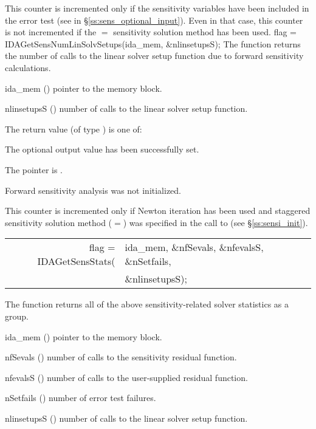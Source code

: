 {
  This counter is incremented only if the sensitivity variables have been included
  in the error test (see  in \S\ref{ss:sens_optional_input}). 
  Even in that case, this counter is not incremented if the $=$ 
  sensitivity solution method has been used.
}
{
  flag = IDAGetSensNumLinSolvSetups(ida\_mem, \&nlinsetupsS);
}
{
  The function  returns the number of calls
  to the linear solver setup function due to forward sensitivity calculations.
}
{
  \begin{args}
  \item[ida\_mem] ()
    pointer to the {\idas} memory block.
  \item[nlinsetupsS] ()
    number of calls to the linear solver setup function.
  \end{args}
}
{
  The return value  (of type ) is one of:
  \begin{args}
  \item[\Id{IDA\_SUCCESS}] 
    The optional output value has been successfully set.
  \item[\Id{IDA\_MEM\_NULL}]
    The  pointer is .
  \item[\Id{IDA\_NO\_SENS}]
    Forward sensitivity analysis was not initialized.
  \end{args}
}
{
  This counter is incremented only if Newton iteration has been used and
  staggered sensitivity solution method ($=$)
  was specified in the call to  (see \S\ref{ss:sensi_init}).
}
{
  \begin{tabular}[t]{@{}r@{}l@{}}
    flag = IDAGetSensStats(&ida\_mem, \&nfSevals, \&nfevalsS, \&nSetfails,\\
                             &\&nlinsetupsS);
  \end{tabular}
}
{
  The function  returns all of the above sensitivity-related solver
  statistics as a group.
}
{
  \begin{args}
  \item[ida\_mem] ()
    pointer to the {\idas} memory block.
  \item[nfSevals] ()
    number of calls to the sensitivity residual function.
  \item[nfevalsS] ()
    number of calls to the user-supplied residual function.
  \item[nSetfails] ()
    number of error test failures.
  \item[nlinsetupsS] ()
    number of calls to the linear solver setup function.
  \end{args}
}
